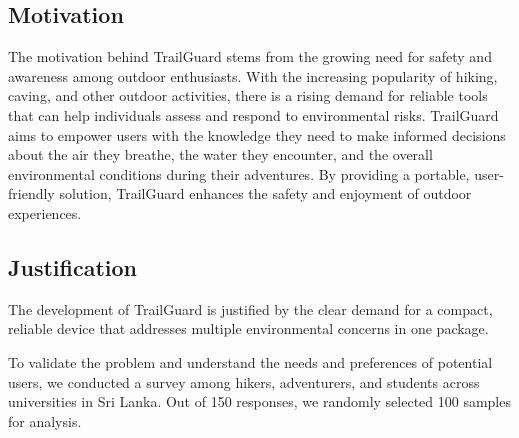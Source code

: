 \documentclass[a4paper,11pt]{article}%
\begin{document}
\subsection{Motivation}
The motivation behind TrailGuard stems from the growing need for safety and awareness among outdoor enthusiasts. With the increasing popularity of hiking, caving, and other outdoor activities, there is a rising demand for reliable tools that can help individuals assess and respond to environmental risks. TrailGuard aims to empower users with the knowledge they need to make informed decisions about the air they breathe, the water they encounter, and the overall environmental conditions during their adventures. By providing a portable, user-friendly solution, TrailGuard enhances the safety and enjoyment of outdoor experiences.

\subsection{Justification}
The development of TrailGuard is justified by the clear demand for a compact, reliable device that addresses multiple environmental concerns in one package. 

To validate the problem and understand the needs and preferences of potential users, we conducted a survey among hikers, adventurers, and students across universities in Sri Lanka. Out of 150 responses, we randomly selected 100 samples for analysis.
\\ 
\\
\\
\\
\end{document}
